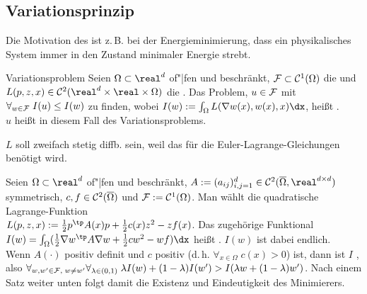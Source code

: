 \pagebreak

\subsection{%
    Variationsprinzip%
}

\begin{Bem}
    Die Motivation des  ist z.\,B. bei der Energieminimierung, dass
    ein physikalisches System immer in den Zustand minimaler Energie strebt.
\end{Bem}

\begin{Def}{Variationsproblem}
    Seien $\Omega \subset \real^d$ of"|fen und beschränkt,
    $\mathcal{F} \subset \mathcal{C}^1(\Omega)$ die  und
    $L(p, z, x) \in \C^2(\real^d \times \real \times \Omega)$ die
    .
    Das Problem, $u \in \mathcal{F}$ mit $\forall_{w \in \mathcal{F}}\; I(u) \le I(w)$ zu finden,
    wobei $I(w) := \int_\Omega L(\nabla w(x), w(x), x) \dx$, heißt .\\
    $u$ heißt in diesem Fall  des Variationsproblems.
\end{Def}

\begin{Bem}
    $L$ soll zweifach stetig diffb. sein, weil das für die Euler-Lagrange-Gleichungen benötigt
    wird.
\end{Bem}

\linie

\begin{Bsp}
    Seien $\Omega \subset \real^d$ of"|fen und beschränkt,
    $A := (a_{ij})_{i,j=1}^d \in \C^2(\overline{\Omega}, \real^{d \times d})$
    symmetrisch, $c, f \in \mathcal{C}^2(\overline{\Omega})$ und $\mathcal{F} := \mathcal{C}^1(\Omega)$.
    Man wählt die quadratische Lagrange-Funktion\\
    $L(p, z, x) := \frac{1}{2} p^\tp A(x) p + \frac{1}{2} c(x) z^2 - z f(x)$.
    Das zugehörige Funktional\\
    $I(w) = \int_\Omega (\frac{1}{2} \nabla w^\tp A \nabla w + \frac{1}{2} cw^2 - wf) \dx$
    heißt .
    $I(w)$ ist dabei endlich.\\
    Wenn $A(\cdot)$ positiv definit und $c$ positiv (d.\,h. $\forall_{x \in \Omega}\; c(x) > 0$)
    ist,
    dann ist $I$ , also
    $\forall_{w, w' \in \mathcal{F},\; w \not= w'} \forall_{\lambda \in (0, 1)}\;
    \lambda I(w) + (1 - \lambda) I(w') > I(\lambda w + (1-\lambda) w')$.
    Nach einem Satz weiter unten folgt damit die Existenz und Eindeutigkeit des Minimierers.
\end{Bsp}

